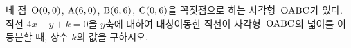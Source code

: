 네 점~$\mathrm{O}(0{,}\mkern3mu\mathopen{}0)$, $\mathrm{A}(6{,}\mkern3mu\mathopen{}0)$, $\mathrm{B}(6{,}\mkern3mu\mathopen{}6)$, $\mathrm{C}(0{,}\mkern3mu\mathopen{}6)$을 꼭짓점으로 하는 사각형~$\mathrm{OABC}$가 있다. 직선 $4x-y+k=0$을 $y$축에 대하여 대칭이동한 직선이 사각형~$\mathrm{OABC}$의 넓이를 이등분할 때, 상수 $k$의 값을 구하시오.
